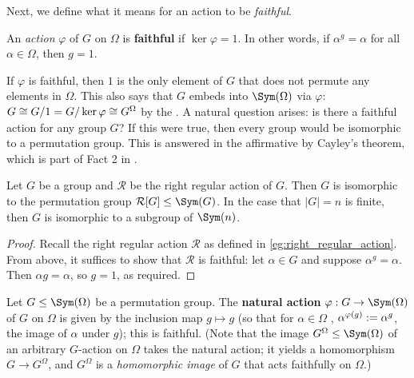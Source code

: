 
Next, we define what it means for an action to be \textit{faithful}.

\begin{definition}\label{def:faithful_action}
    An \textit{action} $\varphi$ of $G$ on $\Omega$ is \textbf{faithful} if $\ker\varphi = 1$. In other words, if $\alpha^g = \alpha$ for all $\alpha \in \Omega$, then $g = 1$.
\end{definition}

If $\varphi$ is faithful, then $1$ is the only element of $G$ that does not permute any elements in $\Omega$. This also says that $G$ embeds into $\Sym(\Omega)$ via $\varphi$: $G \cong G/1 = G/\ker\varphi \cong \added{1}{G^\Omega}$ by the . A natural question arises: is there a faithful action for any group $G$? If this were true, then every group would be isomorphic to a permutation group. This is answered in the affirmative by Cayley's theorem, which is part of Fact 2 in \cite{blaha1992}.

\begin{theorem}[Cayley]\label{thm:cayley}
    Let $G$ be a group and $\mathcal{R}$ be the right regular action of $G$. Then $G$ is isomorphic to the permutation group $\mathcal{R}[G] \leq \Sym(G)$. In the case that $|G| = n$ is finite, then $G$ is isomorphic to a subgroup of $\Sym(n)$.
\end{theorem}

\begin{proof}
    Recall the right regular action $\mathcal{R}$ as defined in \autoref{eg:right_regular_action}. From above, it suffices to show that $\mathcal{R}$ is faithful: let $\alpha \in G$ and suppose $\alpha^g = \alpha$. Then $\alpha g = \alpha$, so  $g = 1$, as required.
\end{proof}

\begin{example}\label{eg:natural_action}
    Let $G \leq \Sym(\Omega)$ be a permutation group. The \textbf{natural action} $\varphi : G \to \Sym(\Omega)$ of $G$ on $\Omega$ is given by the inclusion map $g \mapsto g$ (so that for $\alpha \in \Omega$ , $\added{4}{\alpha^{\varphi(g)}} := \alpha^g$, the image of $\alpha$ under $g$); this is faithful. (Note that the image $G^\Omega \leq \Sym(\Omega)$ of an arbitrary $G$-action on $\Omega$ takes the natural action; it yields a homomorphism $G \to G^\Omega$, and $G^\Omega$ is a \textit{homomorphic image} of $G$ that acts faithfully on $\Omega$.)
\end{example}

